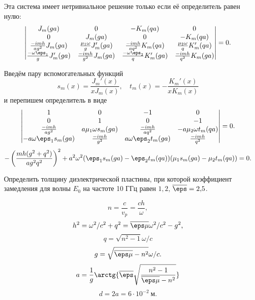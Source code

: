Эта система имеет нетривиальное решение только если её определитель равен нулю:
\[
	\begin{vmatrix}
		J_m(ga) & 0 & -K_m(qa) & 0 \\
		0 & J_m(ga) & 0 & -K_m(qa) \\
		\frac{-imh}{ag^2}J_m(ga) & \frac{\mu_1\omega}{g}J_m'(ga) & \frac{-imh}{aq^2}K_m(qa) & \frac{\mu_2\omega}{q}K_m'(qa)\\
		\frac{-\omega\eps_1}{g}J_m'(ga) & \frac{-imh}{g^2}J_m(ga) & \frac{-\omega\eps_2}{q}K_m'(ga) & \frac{-imh}{q^2}K_m(ga)\\
	\end{vmatrix} = 0.
\]

Введём пару вспомогательных функций
\[
	s_m(x) = \frac{J_m'(x)}{xJ_m(x)},\quad
	t_m(x) = -\frac{K_m'(x)}{xK_m(x)}
\]
и перепишем определитель в виде
\[
	\begin{vmatrix}
		1 & 0 & -1 & 0 \\
		0 & 1 & 0 & -1 \\
		\frac{-imh}{ag^2} & a\mu_1\omega s_m(ga) & \frac{-imh}{aq^2} & -a\mu_2\omega t_m(qa)\\
		-a\omega\eps_1 s_m(ga) & \frac{-imh}{g^2} & a\omega\eps_2t_m(ga) & \frac{-imh}{q^2}\\
	\end{vmatrix} = 0.
\]
\[
	-\left(\frac{mh(g^2 + q^2)}{ag^2q^2}\right)^2 + a^2\omega^2(\eps_1s_m(ga) - \eps_2t_m(qa))(\mu_1 s_m(ga) - \mu_2 t_m(qa)) = 0.
\]

\begin{problem}
Определить толщину диэлектрической пластины, при которой коэффициент замедления для волны \(E_0\) на частоте 10 ГГц равен \( 1,\!2 \), \(\overline{\eps} = 2,\!5\).
\end{problem}

\[
	n = \frac{c}{v_p} = \frac{ch}{\omega},
\]
\[
	h^2 = \omega^2/c^2 + q^2 = \overline{\eps\mu}\omega^2/c^2 - g^2,
\]
\[
	q = \sqrt{n^2 - 1}\omega/ c
\]
\[
	g = \sqrt{\overline{\eps\mu} - n^2}\omega / c.
\]
\[
	a = \frac{1}{g}\arctg{\overline{\eps}\sqrt{\frac{n^2-1}{\overline{\eps\mu} - n^2}}}
\]
\[
	d = 2a = 6\cdot10^{-2}~\text{м}.
\]
